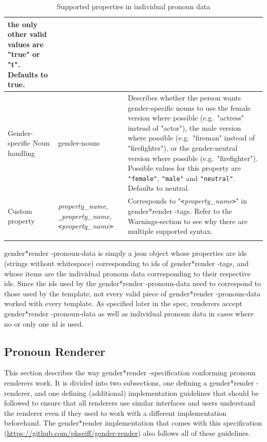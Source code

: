 \documentclass{article}
\newcommand{\GenderRender}{
    gender*render
}
\begin{document}
\begin{flushleft}
\begin{center}
\begin{longtable}{|>{\raggedright\arraybackslash}p{7em} | >{\raggedright\arraybackslash}p{9em} | >{\raggedright\arraybackslash}p{14em} |}
                 the only other valid values are "true" or "t".
                 Defaults to true.\\
                 \hline
                 Gender-specific Noun handling & gender-nouns & Describes whether the person wants gender-specific nouns to use the female version where possible (e.g.\ "actress" instead of "actor"), the male version where possible (e.g.\ "fireman" instead of "firefighter"), or the gender-neutral version where possible (e.g.\ "firefighter").
                 Possible values for this property are \texttt{"female"}, \texttt{"male"} and \texttt{"neutral"}.
                 Defaults to neutral.\\
                 \hline
                 \hline
                 Custom property & \emph{property\_name}, \texttt{\_}\emph{property\_name}, \texttt{<}\emph{property\_name}\texttt{>} & Corresponds to "\texttt{<}\emph{property\_name}\texttt{>}" in \GenderRender-tags.
                 Refer to the Warnings-section to see why there are multiple supported syntax.\\
                 \hline
                \caption{Supported properties in individual pronoun data}
            \end{longtable}
        \end{center}
    \end{flushleft}

    \GenderRender-pronoun-data is simply a json object whose properties are ids (strings without whitespace) corresponding to ids of \GenderRender-tags, and whose items are the individual pronoun data corresponding to their respective ids.
    Since the ids used by the \GenderRender-pronoun-data need to correspond to those used by the template, not every valid piece of \GenderRender-pronoun-data worked with every template.
    As specified later in the spec, renderers accept \GenderRender-pronoun-data as well as individual pronoun data in cases where no or only one id is used.

    \subsection{Pronoun Renderer}

    This section describes the way \GenderRender-specification conforming pronoun renderers work.
    It is divided into two subsections, one defining a \GenderRender-renderer, and one defining (additional) implementation guidelines that should be followed to ensure that all renderers use similar interfaces and users understand the renderer even if they used to work with a different implementation beforehand.
    The \GenderRender implementation that comes with this specification (\url{https://github.com/phseiff/gender-render}) also follows all of these guidelines.
\end{document}
